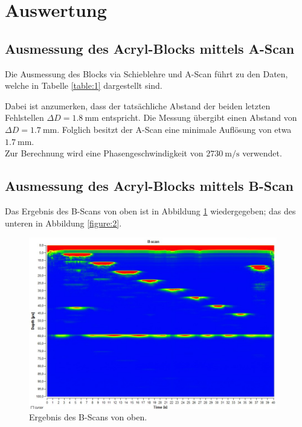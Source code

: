 \section{Auswertung}
\label{sec:Auswertung}

\subsection{Ausmessung des Acryl-Blocks mittels A-Scan}

Die Ausmessung des Blocks via Schieblehre und A-Scan führt zu den Daten, welche in Tabelle \ref{table:1} dargestellt sind.

Dabei ist anzumerken, dass der tatsächliche Abstand der beiden letzten Fehlstellen $\Delta D = \SI{1.8}{\milli\metre}$ entspricht.
Die Messung übergibt einen Abstand von $\Delta D = \SI{1.7}{\milli\metre}$.
Folglich besitzt der A-Scan eine minimale Auflösung von etwa $\SI{1.7}{\milli\metre}$.\\
Zur Berechnung wird eine Phasengeschwindigkeit von $\SI{2730}{\metre\per\second}$ verwendet. \cite{schall}

\subsection{Ausmessung des Acryl-Blocks mittels B-Scan}
Das Ergebnis des B-Scans von oben ist in Abbildung \ref{figure:1} wiedergegeben; das des unteren in Abbildung \ref{figure:2}.

\begin{figure}[H]
  \centering
  \includegraphics[height=7.5cm]{messdaten/b_oben.png}
  \caption{Ergebnis des B-Scans von oben.}
  \label{figure:1}
\end{figure}

